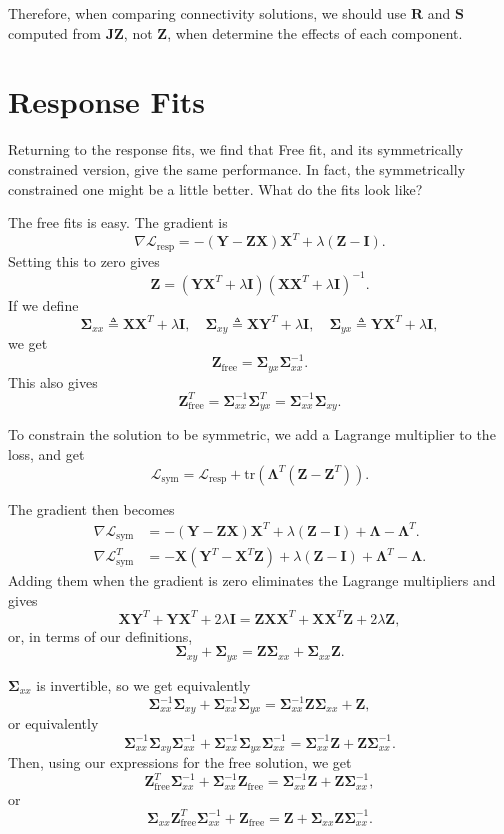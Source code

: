 \documentclass[10pt]{article}
\newcommand{\bLa}{\boldsymbol{\Lambda}}
\newcommand{\bSig}{\boldsymbol{\Sigma}}
\newcommand{\loss}[1]{\mathcal{L}_\text{#1}}
\newcommand{\XX}{\mathbf{X}}
\newcommand{\ZZ}{\mathbf{Z}}
\newcommand{\JJ}{\mathbf{J}}
\newcommand{\II}{\mathbf{I}}
\newcommand{\YY}{\mathbf{Y}}
\newcommand{\RR}{\mathbf{R}}
\renewcommand{\SS}{\mathbf{S}}
\newcommand{\tr}{\text{tr}}
\begin{document}
Therefore, when comparing connectivity solutions, we should use $\RR$ and $\SS$ computed from $\JJ \ZZ$, not $\ZZ$, when determine the effects of each component.

\section*{Response Fits}
Returning to the response fits, we find that Free fit, and its symmetrically constrained version, give the same performance. In fact, the symmetrically constrained one might be a little better. What do the fits look like?

The free fits is easy. The gradient is $$ \nabla \loss{resp} = -(\YY - \ZZ \XX)\XX^T + \lambda (\ZZ - \II).$$ Setting this to zero gives
$$ \ZZ = (\YY \XX^T + \lambda \II)  (\XX \XX^T + \lambda \II)^{-1} .$$
If we define $$ \bSig_{xx} \triangleq \XX \XX^T + \lambda \II, \quad \bSig_{xy} \triangleq \XX \YY^T + \lambda \II, \quad \bSig_{yx} \triangleq \YY \XX^T + \lambda \II,$$
we get $$ \ZZ_\text{free} = \bSig_{yx} \bSig_{xx}^{-1}.$$
This also gives $$ \ZZ_\text{free}^T = \bSig_{xx}^{-1} \bSig_{yx}^T = \bSig_{xx}^{-1} \bSig_{xy}.$$

To constrain the solution to be symmetric, we add a Lagrange multiplier to the loss, and get $$ \loss{sym} = \loss{resp} + \tr(\bLa^T (\ZZ - \ZZ^T)).$$

The gradient then becomes
\begin{align*} \nabla \loss{sym} &= -(\YY - \ZZ \XX)\XX^T + \lambda (\ZZ - \II) + \bLa - \bLa^T.\\
  \nabla \loss{sym}^T &= -\XX(\YY^T - \XX^T \ZZ) + \lambda (\ZZ - \II) + \bLa^T - \bLa.
\end{align*}
Adding them when the gradient is zero eliminates the Lagrange multipliers and gives
$$ \XX \YY^T + \YY \XX^T + 2\lambda \II = \ZZ \XX \XX^T + \XX \XX^T \ZZ + 2\lambda \ZZ,$$
or, in terms of our definitions, 
$$ \bSig_{xy} + \bSig_{yx} = \ZZ \bSig_{xx} + \bSig_{xx}\ZZ.$$

$\bSig_{xx}$ is invertible, so we get equivalently $$ \bSig_{xx}^{-1} \bSig_{xy} + \bSig_{xx}^{-1} \bSig_{yx} = \bSig_{xx}^{-1}\ZZ \bSig_{xx} + \ZZ,$$ or equivalently
$$ \bSig_{xx}^{-1} \bSig_{xy}\bSig_{xx}^{-1} + \bSig_{xx}^{-1} \bSig_{yx} \bSig_{xx}^{-1}  = \bSig_{xx}^{-1}\ZZ  + \ZZ  \bSig_{xx}^{-1}.$$ 
Then, using our expressions for the free solution, we get $$ \ZZ_\text{free}^T \bSig_{xx}^{-1} + \bSig_{xx}^{-1} \ZZ_\text{free} = \bSig_{xx}^{-1} \ZZ + \ZZ \bSig_{xx}^{-1},$$
or $$ \bSig_{xx} \ZZ_\text{free}^T \bSig_{xx}^{-1} + \ZZ_\text{free} = \ZZ + \bSig_{xx} \ZZ \bSig_{xx}^{-1}. $$
\end{document}

